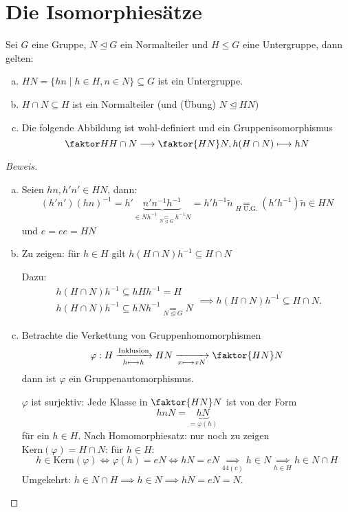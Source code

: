 \documentclass[a4paper]{report}
\begin{document}
\section{Die Isomorphiesätze}
\begin{satz}
  Sei $G$ eine Gruppe, $N \trianglelefteq G$ ein Normalteiler und $H \le G$ eine Untergruppe, dann gelten:
  \begin{enumerate}[(a)]
    \item $HN = \{hn \mid h \in H, n \in N\} \subseteq G$ ist ein Untergruppe.
    \item $H \cap N \subseteq H$ ist ein Normalteiler (und (Übung) $N \trianglelefteq HN$)
    \item Die folgende Abbildung ist wohl-definiert und ein Gruppenisomorphismus $$\faktor H{H \cap N} \longrightarrow \faktor {HN}N, h(H\cap N) \longmapsto hN$$
  \end{enumerate}
\begin{proof}[Beweis]
\begin{enumerate}[(a)]
  \item Seien $hn, h'n' \in HN$, dann:
        $$(h'n')(hn)^{-1}=h'\underbrace{n'n^{-1}h^{-1}}_{\in Nh^{-1} \underset{N \trianglelefteq G} = h^{-1}N} = h'h^{-1}\tilde n \underset{H \text{ U.G.}}= (h'h^{-1})\tilde n \in HN$$
        und $e = ee = HN$
  \item Zu zeigen: für $h \in H$ gilt $h(H \cap N)h^{-1} \subseteq H \cap N$

        Dazu:
        $$\begin{matrix}
            h (H \cap N)h^{-1} \subseteq hHh^{-1} = H \\
            h (H \cap N)h^{-1} \subseteq hNh^{-1} \underset{N \trianglelefteq G}= N
          \end{matrix} \implies h(H \cap N)h^{-1} \subseteq H \cap N.$$

  \item Betrachte die Verkettung von Gruppenhomomorphismen
        $$\varphi: H \xrightarrow[h \longmapsto h]{\text{Inklusion}} HN \xrightarrow[x \longmapsto xN]{} \faktor{HN}N$$
        dann ist $\varphi$ ein Gruppenautomorphismus.

        $\varphi$ ist surjektiv: Jede Klasse in $\faktor{HN}N$ ist von der Form $$hnN = \underbrace{hN}_{=\varphi(h)}$$
        für ein $h \in H$. Nach Homomorphiesatz: nur noch zu zeigen $\mathrm{Kern}(\varphi) = H \cap N$:
        für $h \in H$: $$h \in \mathrm{Kern}(\varphi) \iff \varphi(h) = eN \iff hN = eN \underset{44(c)}\implies h \in N \underset{h \in H}\implies h \in N \cap H$$
        Umgekehrt: $h \in N \cap H \implies h \in N \implies hN = eN = N$.
\end{enumerate}
\end{proof}
\end{satz}
\end{document}
